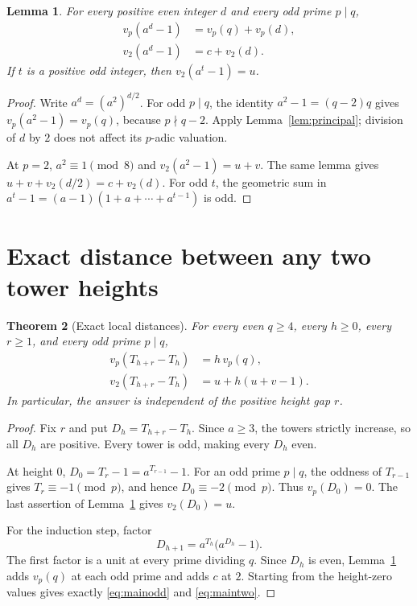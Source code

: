 \documentclass[11pt,a4paper]{article}
\numberwithin{equation}{section}
\theoremstyle{plain}
\newtheorem{theorem}{Theorem}[section]
\newtheorem{lemma}[theorem]{Lemma}
\theoremstyle{definition}
\begin{document}
\begin{lemma}\label{lem:even-exponent}
For every positive even integer $d$ and every odd prime $p\mid q$,
\begin{align}
 v_p(a^d-1)&=v_p(q)+v_p(d),\label{eq:odd-lte}\\
 v_2(a^d-1)&=c+v_2(d).\label{eq:two-lte}
\end{align}
If $t$ is a positive odd integer, then $v_2(a^t-1)=u$.
\end{lemma}
\begin{proof}
Write $a^d=(a^2)^{d/2}$.  For odd $p\mid q$, the identity
$a^2-1=(q-2)q$ gives $v_p(a^2-1)=v_p(q)$, because
$p\nmid q-2$.  Apply Lemma~\ref{lem:principal}; division of $d$ by $2$
does not affect its $p$-adic valuation.

At $p=2$, $a^2\equiv1\pmod8$ and $v_2(a^2-1)=u+v$.
The same lemma gives $u+v+v_2(d/2)=c+v_2(d)$.
For odd $t$, the geometric sum in
$a^t-1=(a-1)(1+a+\cdots+a^{t-1})$ is odd.
\end{proof}

\section{Exact distance between any two tower heights}\label{sec:distance}

\begin{theorem}[Exact local distances]\label{thm:local}
For every even $q\ge4$, every $h\ge0$, every $r\ge1$, and every odd
prime $p\mid q$,
\begin{align}
 v_p(T_{h+r}-T_h)&=h\,v_p(q),\label{eq:mainodd}\\
 v_2(T_{h+r}-T_h)&=u+h(u+v-1).\label{eq:maintwo}
\end{align}
In particular, the answer is independent of the positive height gap $r$.
\end{theorem}
\begin{proof}
Fix $r$ and put $D_h=T_{h+r}-T_h$.  Since $a\ge3$, the towers strictly
increase, so all $D_h$ are positive.  Every tower is odd, making every
$D_h$ even.

At height $0$, $D_0=T_r-1=a^{T_{r-1}}-1$.
For an odd prime $p\mid q$, the oddness of $T_{r-1}$ gives
$T_r\equiv-1\pmod p$, and hence $D_0\equiv-2\pmod p$.
Thus $v_p(D_0)=0$.  The last assertion of
Lemma~\ref{lem:even-exponent} gives $v_2(D_0)=u$.

For the induction step, factor
\begin{equation}\label{eq:Drec}
 D_{h+1}=a^{T_h}\bigl(a^{D_h}-1\bigr).
\end{equation}
The first factor is a unit at every prime dividing $q$.
Since $D_h$ is even, Lemma~\ref{lem:even-exponent} adds $v_p(q)$ at each
odd prime and adds $c$ at $2$.  Starting from the height-zero values
gives exactly \eqref{eq:mainodd} and \eqref{eq:maintwo}.
\end{proof}
\end{document}
